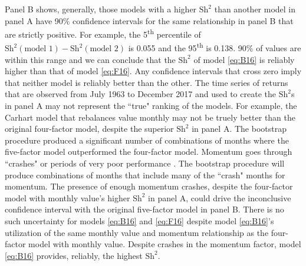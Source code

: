 Panel B shows,
generally, those models with a higher $\text{Sh}^2$ than another model in panel
A have 90\% confidence intervals for the same relationship in panel B that are
strictly positive. For example, the 5\textsuperscript{th} percentile of
$\text{Sh}^2(\text{model 1})-\text{Sh}^2(\text{model 2})$ is 0.055 and the
95\textsuperscript{th} is 0.138. 90\% of values are within this range and we
can conclude that the $\text{Sh}^2$ of model \ref{eq:B16} is reliably higher
than that of model \ref{eq:F16}.
Any confidence intervals that cross zero imply that neither model is reliably
better than the other. The time series of returns that are observed from July
1963 to December 2017 and used to create the $\text{Sh}^2$s in panel A may not
represent the ``true" ranking of the models.
For example, the Carhart model that rebalances value monthly may not be truely
better than the original four-factor model, despite the superior $\text{Sh}^2$
in panel A. The bootstrap procedure produced a significant number of
combinations of months where the five-factor model
outperformed the four-factor model.
Momentum goes through ``crashes" or periods of very poor performance
\parencite{daniel2016momentum, barroso2015momentum}.
The bootstrap procedure will produce combinations of months that include
many of the ``crash" months for momentum.
The presence of enough momentum crashes, despite the four-factor model with
monthly value's higher $\text{Sh}^2$ 
in panel A, could drive the inconclusive confidence interval with the original
five-factor model in panel B.
There is no such uncertainty for models \ref{eq:B16} and \ref{eq:F16} despite
model \ref{eq:B16}'s utilization of the same monthly value and momentum
relationship as the four-factor model with monthly value.
Despite crashes in the momentum factor, model \ref{eq:B16} provides, reliably,
the highest $\text{Sh}^2$.

